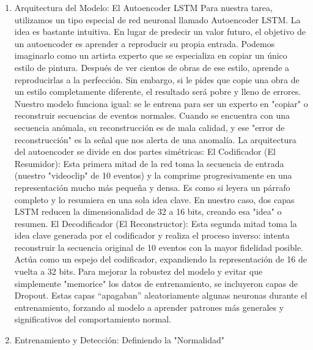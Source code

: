\begin{enumerate}
\begin{enumerate}
                  \item Arquitectura del Modelo: El Autoencoder LSTM
                        Para nuestra tarea, utilizamos un tipo especial de red neuronal llamado Autoencoder LSTM. La idea es bastante intuitiva. En lugar de predecir un valor futuro, el objetivo de un autoencoder es aprender a reproducir su propia entrada.
                        Podemos imaginarlo como un artista experto que se especializa en copiar un único estilo de pintura. Después de ver cientos de obras de ese estilo, aprende a reproducirlas a la perfección. Sin embargo, si le pides que copie una obra de un estilo completamente diferente, el resultado será pobre y lleno de errores.
                        Nuestro modelo funciona igual: se le entrena para ser un experto en "copiar" o reconstruir secuencias de eventos normales. Cuando se encuentra con una secuencia anómala, su reconstrucción es de mala calidad, y ese "error de reconstrucción" es la señal que nos alerta de una anomalía.
                        La arquitectura del autoencoder se divide en dos partes simétricas:
                        El Codificador (El Resumidor): Esta primera mitad de la red toma la secuencia de entrada (nuestro "videoclip" de 10 eventos) y la comprime progresivamente en una representación mucho más pequeña y densa. Es como si leyera un párrafo completo y lo resumiera en una sola idea clave. En nuestro caso, dos capas LSTM reducen la dimensionalidad de 32 a 16 bits, creando esa "idea" o resumen.
                        El Decodificador (El Reconstructor): Esta segunda mitad toma la idea clave generada por el codificador y realiza el proceso inverso: intenta reconstruir la secuencia original de 10 eventos con la mayor fidelidad posible. Actúa como un espejo del codificador, expandiendo la representación de 16 de vuelta a 32 bits.
                        Para mejorar la robustez del modelo y evitar que simplemente "memorice" los datos de entrenamiento, se incluyeron capas de Dropout. Estas capas ``apagaban'' aleatoriamente algunas neuronas durante el entrenamiento, forzando al modelo a aprender patrones más generales y significativos del comportamiento normal.

                  \item Entrenamiento y Detección: Definiendo la "Normalidad"


\end{enumerate}
\end{enumerate}
